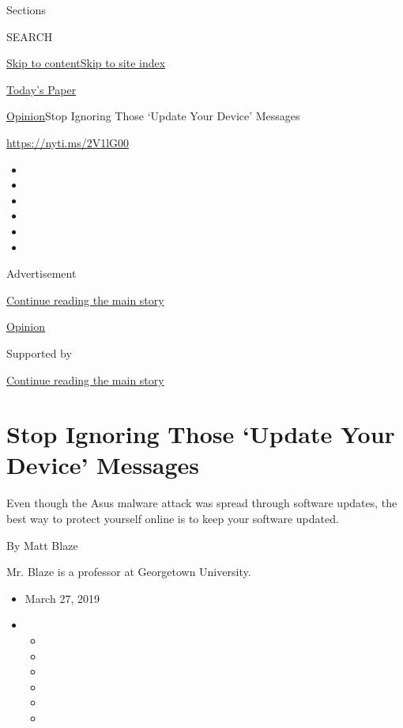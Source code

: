 Sections

SEARCH

\protect\hyperlink{site-content}{Skip to
content}\protect\hyperlink{site-index}{Skip to site index}

\href{https://myaccount.nytimes.com/auth/login?response_type=cookie\&client_id=vi}{}

\href{https://www.nytimes.com/section/todayspaper}{Today's Paper}

\href{/section/opinion}{Opinion}\textbar{}Stop Ignoring Those `Update
Your Device' Messages

\url{https://nyti.ms/2V1lG00}

\begin{itemize}
\item
\item
\item
\item
\item
\item
\end{itemize}

Advertisement

\protect\hyperlink{after-top}{Continue reading the main story}

\href{/section/opinion}{Opinion}

Supported by

\protect\hyperlink{after-sponsor}{Continue reading the main story}

\hypertarget{stop-ignoring-those-update-your-device-messages}{%
\section{Stop Ignoring Those `Update Your Device'
Messages}\label{stop-ignoring-those-update-your-device-messages}}

Even though the Asus malware attack was spread through software updates,
the best way to protect yourself online is to keep your software
updated.

By Matt Blaze

Mr. Blaze is a professor at Georgetown University.

\begin{itemize}
\item
  March 27, 2019
\item
  \begin{itemize}
  \item
  \item
  \item
  \item
  \item
  \item
  \end{itemize}
\end{itemize}

